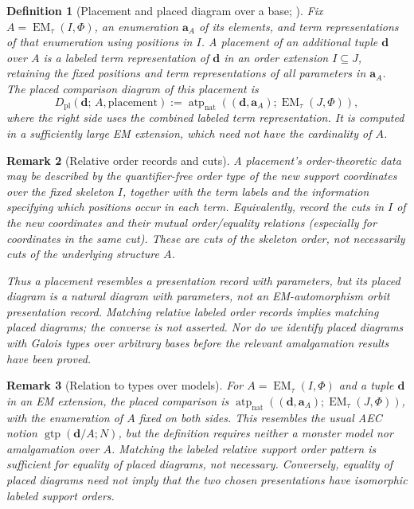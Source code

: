\documentclass[11pt]{article}
\newcommand{\natatp}{\operatorname{atp}_{\mathrm{nat}}}
\newcommand{\EM}{\operatorname{EM}_{\tau}}
\newcommand{\ba}{\mathbf{a}}
\newcommand{\bd}{\mathbf{d}}
\theoremstyle{plain}
\newtheorem{definition}{Definition}[section]
\newtheorem{remark}[definition]{Remark}
\begin{document}
\begin{definition}[Placement and placed diagram over a base;
{\cite[Definition 4.4]{oai-ecc}}]
Fix $A=\EM(I,\Phi)$, an enumeration $\ba_A$ of its elements,
and term representations of that enumeration using positions
in $I$. A \emph{placement} of an additional tuple $\bd$ over $A$
is a labeled term representation of $\bd$ in an order extension
$I\subseteq J$, retaining the fixed positions and term
representations of all parameters in $\ba_A$. The
\emph{placed comparison diagram} of this placement is
\[
D_{\mathrm{pl}}(\bd;\,A,\text{placement})
:=\natatp((\bd,\ba_A);\EM(J,\Phi)),
\]
where the right side uses the combined labeled term representation.
It is computed in a sufficiently large EM extension, which need
not have the cardinality of $A$.
\end{definition}

\begin{remark}[Relative order records and cuts]
A placement's order-theoretic data may be described by the
quantifier-free order type of the new support coordinates over
the fixed skeleton $I$, together with the term labels and the
information specifying which positions occur in each term.
Equivalently, record the cuts in $I$ of the new coordinates and
their mutual order/equality relations (especially for coordinates
in the same cut). These are cuts of the \emph{skeleton order},
not necessarily cuts of the underlying structure $A$.

Thus a placement resembles a presentation record with parameters,
but its \emph{placed diagram} is a \emph{natural diagram with
parameters}, not an EM-automorphism orbit presentation record.
Matching relative labeled order records implies matching placed
diagrams; the converse is not asserted. Nor do we identify
placed diagrams with Galois types over arbitrary bases before
the relevant amalgamation results have been proved.
\end{remark}

\begin{remark}[Relation to types over models]
For $A=\EM(I,\Phi)$ and a tuple $\bd$ in an EM extension,
the placed comparison is
$\natatp((\bd,\ba_A);\EM(J,\Phi))$, with the enumeration
of $A$ fixed on both sides. This resembles the usual
AEC notion $\operatorname{gtp}(\bd/A;N)$, but the
definition requires neither a monster model nor
amalgamation over $A$. Matching the labeled relative
support order pattern is sufficient for equality of
placed diagrams, not necessary. Conversely, equality
of placed diagrams need not imply that the two chosen
presentations have isomorphic labeled support orders.
\end{remark}
\end{document}
